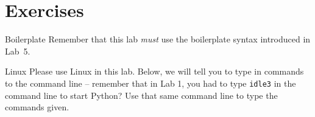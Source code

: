 \documentclass[11pt]{cselabheader}
\begin{document}
\pagebreak

\section{Exercises}
\label{sec:ex}

\begin{warningbox}{Boilerplate}
  Remember that this lab \emph{must} use the
  boilerplate syntax introduced in Lab~5.
\end{warningbox}

\begin{warningbox}{Linux}
  Please use Linux in this lab. Below, we will tell you to type in commands to
  the command line -- remember that in Lab 1, you had to type \texttt{idle3} in
  the command line to start Python? Use that same command line to type the
  commands given.
\end{warningbox}
\end{document}

